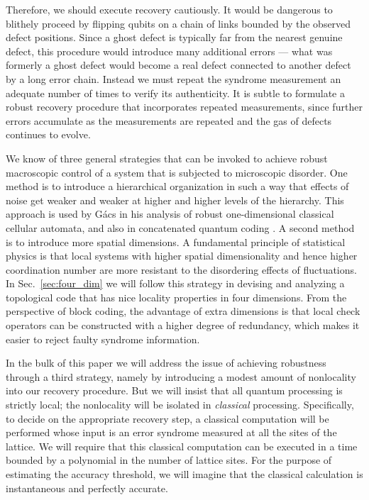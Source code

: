 Therefore, we should execute recovery cautiously. It would be dangerous to blithely proceed by flipping qubits on a chain of links bounded by the observed defect positions. Since a ghost defect is typically far from the nearest genuine defect, this procedure would introduce many additional errors --- what was formerly a ghost defect would become a real defect connected to another defect by a long error chain. Instead we must repeat the syndrome measurement an adequate number of times to verify its authenticity. It is subtle to formulate a robust recovery procedure that incorporates repeated measurements, since further errors accumulate as the measurements are repeated and the gas of defects continues to evolve.

We know of three general strategies that can be invoked to achieve robust macroscopic control of a system that is subjected to microscopic disorder. One method is to introduce a hierarchical organization in such a way that effects of noise get weaker and weaker at higher and higher levels of the hierarchy. This approach is used by G\'acs \cite{gacs} in his analysis of robust one-dimensional classical cellular automata, and also in concatenated quantum coding \cite{knill,ben-or,kitaev_threshold,jp_threshold,gottesman_threshold}. A second method is to introduce more spatial dimensions. A fundamental principle of statistical physics is that local systems with higher spatial dimensionality and hence higher coordination number are more resistant to the disordering effects of fluctuations.  In Sec.~\ref{sec:four_dim} we will follow this strategy in devising and analyzing a topological code that has nice locality properties in four dimensions. From the perspective of block coding, the advantage of extra dimensions is that local check operators can be constructed with a higher degree of redundancy, which makes it easier to reject faulty syndrome information.

In the bulk of this paper we will address the issue of achieving robustness through a third strategy, namely by introducing a modest amount of nonlocality into our recovery procedure. But we will insist that all quantum processing is strictly local; the nonlocality will be isolated in {\em classical} processing. Specifically, to decide on the appropriate recovery step, a classical computation will be performed whose input is an error syndrome measured at all the sites of the lattice. We will require that this classical computation can be executed in a time bounded by a polynomial in the number of lattice sites. For the purpose of estimating the accuracy threshold, we will imagine that the classical calculation is instantaneous and perfectly accurate. 

